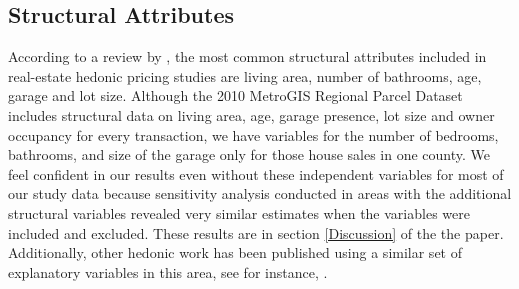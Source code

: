 \documentclass{article}\usepackage{graphicx, color}
\begin{document}
\begin{table}
\caption{Matrix of Pearson Correlation Coefficients for Quantitative Variables}\label{tab:cor}
\begin{center}
\small
\tabcolsep=0.05cm
\end{center} 
\end{table}


\subsection{Structural Attributes}
According to a review by \cite{Wilhelmsson2000}, the most common structural attributes included in real-estate hedonic pricing studies are living area, number of bathrooms, age, garage and lot size.  Although the 2010 MetroGIS Regional Parcel Dataset includes structural data on living area, age, garage presence, lot size and owner occupancy for every transaction, we have variables for the number of bedrooms, bathrooms, and size of the garage only for those house sales in one county. We feel confident in our results even without these independent variables for most of our study data because sensitivity analysis conducted in areas with the additional structural variables revealed very similar estimates when the variables were included and excluded. These results are in section \ref{Discussion} of the the paper. Additionally, other hedonic work has been published using a similar set of explanatory variables in this area, see for instance, \citet{Sander2009b}.
\end{document}
